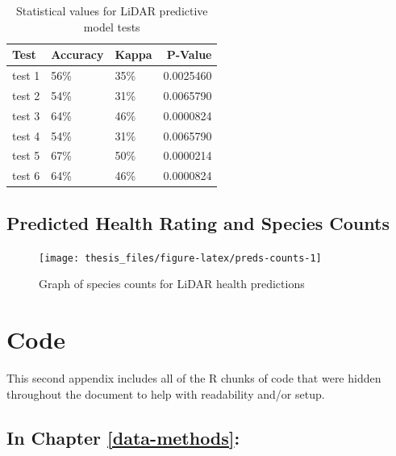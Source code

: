 \documentclass[12pt,twoside]{reedthesis}
\begin{document}
\begin{table}

\caption{\label{tab:model-test-table}Statistical values for LiDAR predictive model tests}
\centering
\begin{tabular}[t]{lllr}
\toprule
Test & Accuracy & Kappa & P-Value\\
\midrule
test 1 & 56\% & 35\% & 0.0025460\\
test 2 & 54\% & 31\% & 0.0065790\\
test 3 & 64\% & 46\% & 0.0000824\\
test 4 & 54\% & 31\% & 0.0065790\\
test 5 & 67\% & 50\% & 0.0000214\\
\addlinespace
test 6 & 64\% & 46\% & 0.0000824\\
\bottomrule
\end{tabular}
\end{table}
\hypertarget{predicted-health-rating-and-species-counts}{%
\section*{Predicted Health Rating and Species Counts}\label{predicted-health-rating-and-species-counts}}
\begin{figure}

{\centering \texttt{[image: thesis\_files/figure-latex/preds-counts-1]} 

}

\caption{Graph of species counts for LiDAR health predictions}\label{fig:preds-counts}
\end{figure}
\hypertarget{code-chunks}{%
\chapter{Code}\label{code-chunks}}

This second appendix includes all of the R chunks of code that were
hidden throughout the document to help with readability and/or setup.

\hypertarget{in-chapter-refdata-methods}{%
\section*{\texorpdfstring{\textbf{In Chapter} \ref{data-methods}\textbf{:}}{In Chapter \ref{data-methods}:}}\label{in-chapter-refdata-methods}}
\end{document}
